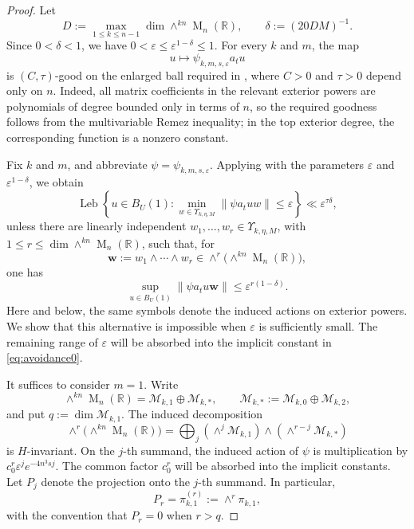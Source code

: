 \documentclass[reqno,11pt]{amsart}
\numberwithin{equation}{section}
\theoremstyle{definition}
\theoremstyle{remark}
\newcommand{\op}{\operatorname}
\newcommand{\M}{\op{M}}
\begin{document}
\begin{proof}
Let
$$
D:=
\max_{1\le k\le n-1}
\dim\wedge^{kn}\M_n(\mathbb R),
\qquad
\delta:=(20DM)^{-1}.
$$
Since $0<\delta<1$, we have
$0<\varepsilon\le\varepsilon^{1-\delta}\le1$. For every $k$ and $m$,
the map
$$
u\mapsto\psi_{k,m,s,\varepsilon}a_tu
$$
is $(C,\tau)$-good on the enlarged ball required in
, where $C>0$ and $\tau>0$ depend only on $n$.
Indeed, all matrix coefficients in the relevant exterior powers are
polynomials of degree bounded only in terms of $n$, so the required
goodness follows from the multivariable Remez inequality; in the top
exterior degree, the corresponding function is a nonzero constant.

Fix $k$ and $m$, and abbreviate
$\psi=\psi_{k,m,s,\varepsilon}$. Applying
 with the parameters
$\varepsilon$ and $\varepsilon^{1-\delta}$, we obtain
\begin{equation}\label{eq:quantitativenondivergenceforwedge}
\operatorname{Leb}
\left\{u\in B_U(1):
\min_{w\in\Upsilon_{k,\eta,M}}
\|\psi a_tuw\|\le\varepsilon
\right\}
\ll
\varepsilon^{\tau\delta},
\end{equation}
unless there are linearly independent
$w_1,\dots,w_r\in\Upsilon_{k,\eta,M}$, with
$1\le r\le\dim\wedge^{kn}\M_n(\mathbb R)$, such that, for
$$
\mathbf w:=w_1\wedge\cdots\wedge w_r
\in\wedge^r\bigl(\wedge^{kn}\M_n(\mathbb R)\bigr),
$$
one has
\begin{equation}\label{eq:shortsubspaceW}
\sup_{u\in B_U(1)}
\|\psi a_tu\mathbf w\|
\le
\varepsilon^{r(1-\delta)}.
\end{equation}
Here and below, the same symbols denote the induced actions on exterior
powers. We show that this alternative is impossible when $\varepsilon$
is sufficiently small. The remaining range of $\varepsilon$ will be
absorbed into the implicit constant in \eqref{eq:avoidance0}.

It suffices to consider $m=1$. Write
$$
\wedge^{kn}\M_n(\mathbb R)
=
\mathcal M_{k,1}\oplus\mathcal M_{k,*},
\qquad
\mathcal M_{k,*}
:=
\mathcal M_{k,0}\oplus\mathcal M_{k,2},
$$
and put $q:=\dim\mathcal M_{k,1}$. The induced decomposition
\begin{equation}\label{eq:number-of-exceptional-factors}
\wedge^r\bigl(\wedge^{kn}\M_n(\mathbb R)\bigr)
=
\bigoplus_j
\left(\wedge^j\mathcal M_{k,1}\right)
\wedge
\left(\wedge^{r-j}\mathcal M_{k,*}\right)
\end{equation}
is $H$-invariant. On the $j$-th summand, the induced action of
$\psi$ is multiplication by
$c_0^r\varepsilon^je^{-4n^3sj}$.
The common factor $c_0^r$ will be absorbed into the implicit constants.
Let $P_j$ denote the projection onto the $j$-th summand. In particular,
$$
P_r=\pi_{k,1}^{(r)}:=\wedge^r\pi_{k,1},
$$
with the convention that $P_r=0$ when $r>q$.


\end{proof}
\end{document}
